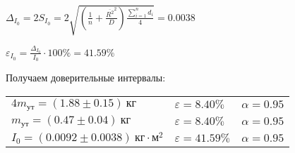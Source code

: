 \begin{enumerate}
    $\displaystyle \Delta_{I_0} = 2S_{{I_0}} = 2\sqrt{\left(\frac{1}{n} + \frac{\overline{R^2}^2}{D}\right) \frac{\sum_{i = 1}^n d_i}{4}} = 0.0038$

    $\displaystyle \varepsilon_{I_0} = \frac{\Delta_{I_0}}{I_0} \cdot 100\% = 41.59\%$

    \clearpage

    Получаем доверительные интервалы:

    \begin{tabular}{lll}
        $4m_{\text{ут}} = (1.88 \pm 0.15) \ \text{кг}$ & $\varepsilon = 8.40\%$ & $\alpha = 0.95$ \\

        $m_{\text{ут}} = (0.47 \pm 0.04) \ \text{кг}$ & $\varepsilon = 8.40\%$ & $\alpha = 0.95$ \\

        $I_0 = (0.0092 \pm 0.0038) \ \text{кг} \cdot \text{м}^2$ & $\varepsilon = 41.59\%$ & $\alpha = 0.95$ \\
    \end{tabular}

    \smallvspace



\end{enumerate}